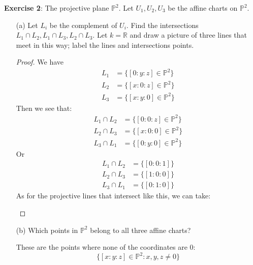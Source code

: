 \documentclass{article}
\begin{document}
\textbf{Exercise 2}: The projective plane $\mathbb{P}^{2}$. Let $U_{1}, U_{2}, U_{3}$ be the affine charts on $\mathbb{P}^{2}$.
    \begin{itemize}
        \item [(a)] Let $L_{i}$ be the complement of $U_{i}$. Find the intersections $L_{1} \cap L_{2}, L_{1} \cap L_{3}, L_{2} \cap L_{3}$. Let $k = \mathbb{R}$ and draw a picture of three lines that meet in this way; label the lines and intersections points.
            \begin{proof}
                We have
                    \begin{align*}
                        L_{1} &= \{[0 : y : z] \in \mathbb{P}^{2}\} \\
                        L_{2} &= \{[x : 0 : z] \in \mathbb{P}^{2}\} \\
                        L_{3} &= \{[x : y : 0] \in \mathbb{P}^{2}\}   
                    \end{align*}
                Then we see that:
                    \begin{align*}
                        L_{1} \cap L_{2} &= \{[0 : 0 : z] \in \mathbb{P}^{2}\} \\
                        L_{2} \cap L_{3} &= \{[x : 0 : 0] \in \mathbb{P}^{2}\} \\
                        L_{3} \cap L_{1} &= \{[0 : y : 0] \in \mathbb{P}^{2}\}   
                    \end{align*}
                Or
                    \begin{align*}
                        L_{1} \cap L_{2} &= \{[0 : 0 : 1]\}  \\
                        L_{2} \cap L_{3} &= \{[1 : 0 : 0]\}  \\
                        L_{3} \cap L_{1} &= \{[0 : 1 : 0]\}   
                    \end{align*}
                As for the projective lines that intersect like this, we can take:
                    \begin{fixedfigure}
                    \end{fixedfigure}
            \end{proof}

        \item [(b)] Which points in $\mathbb{P}^{2}$ belong to all three affine charts?
            \begin{answer}
                These are the points where none of the coordinates are $0$: 
                    \begin{equation*}
                        \{[x : y : z] \in \mathbb{P}^{2}: x, y, z \neq 0\}
                    \end{equation*}


\end{answer}
\end{itemize}
\end{document}
